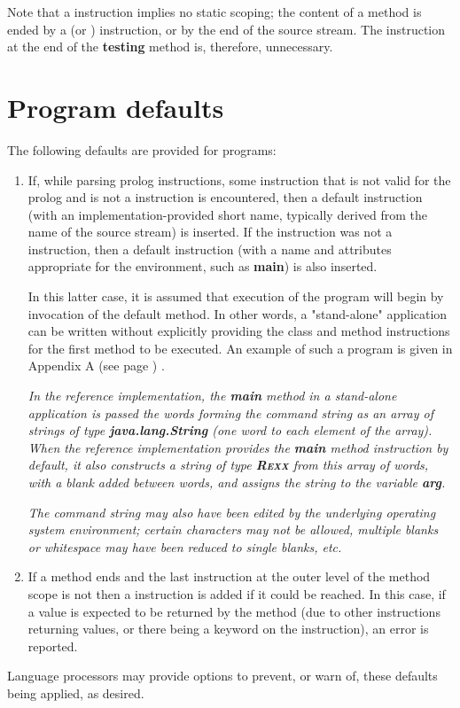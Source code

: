 Note that a  instruction implies no static scoping; the
content of a method is ended by a  (or )
instruction, or by the end of the source stream.
The  instruction at the end of the \textbf{testing}
method is, therefore, unnecessary.
\section{Program defaults}\label{programdefaults}
 
The following defaults are provided for \nr{} programs:
\begin{enumerate}
\item If, while parsing prolog instructions, some instruction that is not
valid for the prolog and is not a  instruction is
encountered, then a default  instruction (with an
implementation-provided short name, typically derived from the name of
the source stream) is inserted.  If the instruction was not a
 instruction, then a default  instruction
(with a name and attributes appropriate for the environment, such
as \textbf{main}) is also inserted.
 
In this latter case, it is assumed that execution of the program will
begin by invocation of the default method.
In other words, a "stand-alone" application can be written without
explicitly providing the class and method instructions for the first
method to be executed.
An example of such a program is given in  Appendix A (see page \pageref{refappa}) .

 
\emph{In the reference implementation, the \textbf{main} method in a
stand-alone application is passed the words forming the command string
as an array of strings of type \textbf{java.lang.String} (one word to
each element of the array).
When the \nr{} reference implementation provides the \textbf{main}
method instruction by default, it also constructs a \nr{} string of
type \textbf{R\textsc{exx}} from this array of words, with a blank added
between words, and assigns the string to the variable
\textbf{arg}.}
 
\emph{The command string may also have been edited by the underlying
operating system environment; certain characters may not be
allowed, multiple blanks or whitespace may have been reduced to
single blanks, etc.
}
\item If a method ends and the last instruction at the outer level of the
method scope is not  then a  instruction
is added if it could be reached.
In this case, if a value is expected to be returned by the method (due
to other  instructions returning values, or there being a
 keyword on the  instruction), an error
is reported.
\end{enumerate}
 
Language processors may provide options to prevent, or warn of, these
defaults being applied, as desired.
